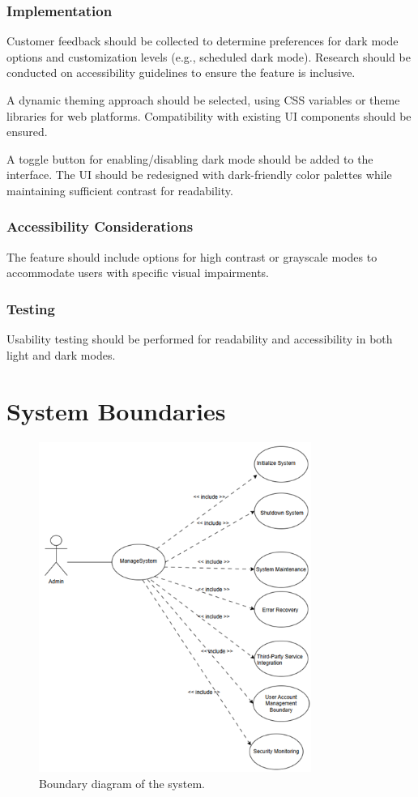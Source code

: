 \documentclass[twoside,a4paper,journal]{IEEEtran}
\begin{document}
\subsubsection{Implementation}
Customer feedback should be collected to determine preferences for dark mode
options and customization levels (e.g., scheduled dark mode).
Research should be conducted on accessibility guidelines to ensure the feature
is inclusive.

A dynamic theming approach should be selected, using CSS variables or theme
libraries for web platforms.
Compatibility with existing UI components should be ensured.

A toggle button for enabling/disabling dark mode should be added to the
interface.
The UI should be redesigned with dark-friendly color palettes while maintaining
sufficient contrast for readability.

\subsubsection{Accessibility Considerations}
The feature should include options for high contrast or grayscale modes to
accommodate users with specific visual impairments.

\subsubsection{Testing}
Usability testing should be performed for readability and accessibility in both
light and dark modes.

\section{System Boundaries}
\begin{figure}[!t]
\centering
\includegraphics[width=3.5in]{boundary}
\caption{Boundary diagram of the system.}
\label{fig:boundary}
\end{figure}
\end{document}
